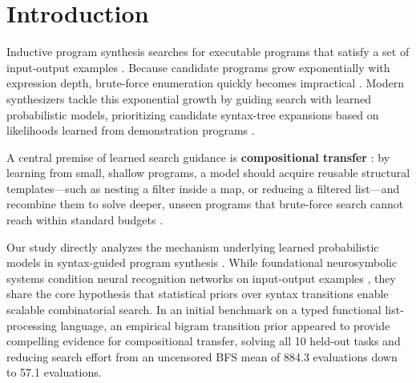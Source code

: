 \documentclass[10pt,twocolumn]{article}
\begin{document}
\section{Introduction}

Inductive program synthesis searches for executable programs that satisfy a set of input-output examples \cite{gulwani2017program, solar2008program, alur2013syntax, manna1980deductive}. Because candidate programs grow exponentially with expression depth, brute-force enumeration quickly becomes impractical \cite{feser2015synthesizing, udupa2013transit}. Modern synthesizers tackle this exponential growth by guiding search with learned probabilistic models, prioritizing candidate syntax-tree expansions based on likelihoods learned from demonstration programs \cite{balog2017deepcoder, devlin2017robustfill, ellis2021dreamcoder, chaudhuri2021neurosymbolic, bunel2018leveraging}.

A central premise of learned search guidance is \textbf{compositional transfer} \cite{ellis2021dreamcoder, lake2015human, andreas2019measuring}: by learning from small, shallow programs, a model should acquire reusable structural templates---such as nesting a filter inside a map, or reducing a filtered list---and recombine them to solve deeper, unseen programs that brute-force search cannot reach within standard budgets \cite{ellis2021dreamcoder, shin2019improving, nye2020learning}.

Our study directly analyzes the mechanism underlying learned probabilistic models in syntax-guided program synthesis \cite{lee2018accelerating}. While foundational neurosymbolic systems condition neural recognition networks on input-output examples \cite{balog2017deepcoder, devlin2017robustfill, ellis2021dreamcoder}, they share the core hypothesis that statistical priors over syntax transitions enable scalable combinatorial search. In an initial benchmark on a typed functional list-processing language, an empirical bigram transition prior appeared to provide compelling evidence for compositional transfer, solving all 10 held-out tasks and reducing search effort from an uncensored BFS mean of 884.3 evaluations down to 57.1 evaluations.
\end{document}
